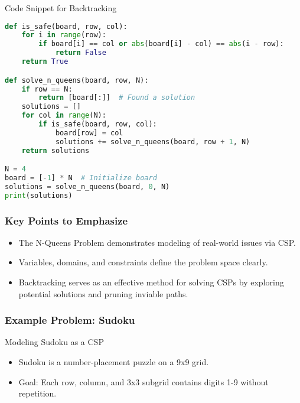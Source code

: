 \documentclass[aspectratio=169]{beamer}
\begin{document}
\begin{frame}[fragile]{Code Snippet for Backtracking}
    \begin{lstlisting}[language=Python]
def is_safe(board, row, col):
    for i in range(row):
        if board[i] == col or abs(board[i] - col) == abs(i - row):
            return False
    return True

def solve_n_queens(board, row, N):
    if row == N:
        return [board[:]]  # Found a solution
    solutions = []
    for col in range(N):
        if is_safe(board, row, col):
            board[row] = col
            solutions += solve_n_queens(board, row + 1, N)
    return solutions

N = 4
board = [-1] * N  # Initialize board
solutions = solve_n_queens(board, 0, N)
print(solutions)
    \end{lstlisting}
\end{frame}

\begin{frame}[fragile]
    \frametitle{Key Points to Emphasize}
    \begin{itemize}
        \item The N-Queens Problem demonstrates modeling of real-world issues via CSP.
        \item Variables, domains, and constraints define the problem space clearly.
        \item Backtracking serves as an effective method for solving CSPs by exploring potential solutions and pruning inviable paths.
    \end{itemize}
\end{frame}

\begin{frame}[fragile]
    \frametitle{Example Problem: Sudoku}
    \begin{block}{Modeling Sudoku as a CSP}
        \begin{itemize}
            \item Sudoku is a number-placement puzzle on a 9x9 grid.
            \item Goal: Each row, column, and 3x3 subgrid contains digits 1-9 without repetition.
        \end{itemize}
    \end{block}
\end{frame}
\end{document}
